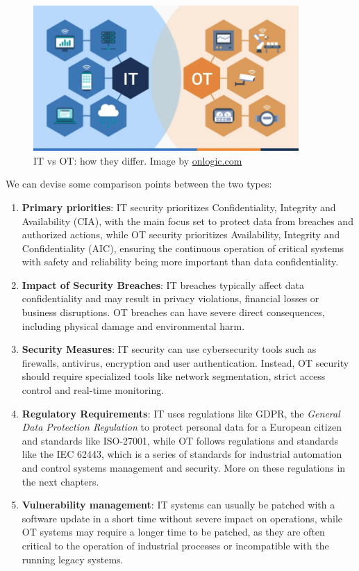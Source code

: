 \begin{figure}[ht]
  \centering
  \includegraphics[width=0.9\textwidth]{chapters/02/assets/it-ot-diff.jpg}
  \caption[IT vs OT: how they differ. Image by onlogic.com]{IT vs OT: how they differ. Image by \url{onlogic.com}}
  \label{fig:it-ot-diff}
\end{figure}

We can devise some comparison points between the two types:
\begin{enumerate}
  \item \textbf{Primary priorities}: IT security prioritizes Confidentiality, Integrity and Availability (CIA), with the main focus set to protect data from breaches and authorized actions, while OT security prioritizes Availability, Integrity and Confidentiality (AIC), ensuring the continuous operation of critical systems with safety and reliability being more important than data confidentiality.
  \item \textbf{Impact of Security Breaches}: IT breaches typically affect data confidentiality and may result in privacy violations, financial losses or business disruptions. OT breaches can have severe direct consequences, including physical damage and environmental harm.
  \item \textbf{Security Measures}: IT security can use cybersecurity tools such as firewalls, antivirus, encryption and user authentication. Instead, OT security should require specialized tools like network segmentation, strict access control and real-time monitoring.
  \item \textbf{Regulatory Requirements}: IT uses regulations like GDPR, the \textit{General Data Protection Regulation} to protect personal data for a European citizen and standards like ISO-27001, while OT follows regulations and standards like the IEC 62443, which is a series of standards for industrial automation and control systems management and security. More on these regulations in the next chapters.
  \item \textbf{Vulnerability management}: IT systems can usually be patched with a software update in a short time without severe impact on operations, while OT systems may require a longer time to be patched, as they are often critical to the operation of industrial processes or incompatible with the running legacy systems.
\end{enumerate}

